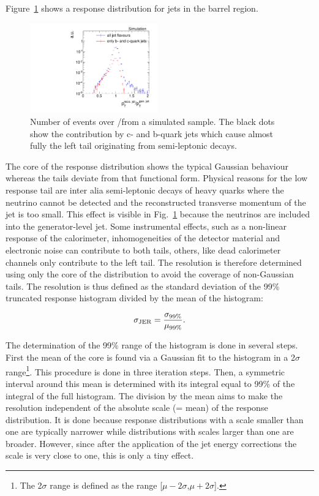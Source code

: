 Figure~\ref{res:fig:TypicalResponse} shows a response distribution for jets in the barrel region.
\begin{figure}[b]
  \centering
      \includegraphics[width=0.49\textwidth]{figures/resolution/generalApproach/intrinsicExampleContributionofBCQuarks.pdf}
  \caption{Number of events over \ptrecojet/\ptgenjet from a simulated \GAMJET sample. 
           The black dots show the contribution by c- and b-quark jets which cause almost fully the left tail originating from semi-leptonic decays. }  
  \label{res:fig:TypicalResponse}
\end{figure}
The core of the response distribution shows the typical Gaussian behaviour whereas the tails deviate from that functional form.
Physical reasons for the low response tail are inter alia semi-leptonic decays of heavy quarks where the neutrino cannot be detected and the reconstructed transverse momentum of the jet is too small.
This effect is visible in Fig.~\ref{res:fig:TypicalResponse} because the neutrinos are included into the generator-level jet.
Some instrumental effects, such as a non-linear response of the calorimeter, inhomogeneities of the detector material and electronic noise can contribute to both tails, 
others, like dead calorimeter channels only contribute to the left tail. 
The resolution is therefore determined using only the core of the distribution to avoid the coverage of non-Gaussian tails.
The resolution is thus defined as the standard deviation of the 99\% truncated response histogram divided by the mean of the histogram:

\begin{equation*}\label{res:eq:resolutionFormula}
\sigma_\mathrm{JER} = \frac{\sigma_{99\%}}{\mu_{99\%}}.
\end{equation*}

The determination of the 99\% range of the histogram is done in several steps. 
First the mean of the core is found via a Gaussian fit to the histogram in a 2$\sigma$ range\footnote{The 2$\sigma$ range is defined as the range [$\mu - 2\sigma$,$\mu + 2\sigma$].}. 
This procedure is done in three iteration steps.
Then, a symmetric interval around this mean is determined with its integral equal to 99\% of the integral of the full histogram. 
The division by the mean aims to make the resolution independent of the absolute scale (= mean) of the response distribution.
It is done because response distributions with a scale smaller than one are typically narrower while distributions with scales larger than one are broader.
However, since after the application of the jet energy corrections the scale is very close to one, this is only a tiny effect.

